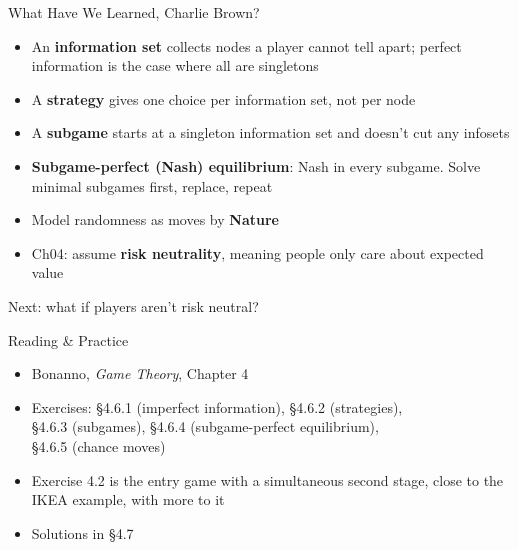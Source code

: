 \begin{frame}{What Have We Learned, Charlie Brown?}
\begin{itemize}
    \item An \textbf{information set} collects nodes a player cannot tell apart;
      perfect information is the case where all are singletons
    \item A \textbf{strategy} gives one choice per information set, not per node
    \item A \textbf{subgame} starts at a singleton information set and doesn't cut any infosets
    \item \textbf{Subgame-perfect (Nash) equilibrium}: Nash in every subgame. Solve minimal
      subgames first, replace, repeat
    \item Model randomness as moves by \textbf{Nature}
    \item Ch04: assume \textbf{risk neutrality}, meaning people only care about expected value
\end{itemize}
\vfill
Next: what if players aren't risk neutral?
\vspace{-0.4in}
\end{frame}

\begin{frame}{Reading \& Practice}
\begin{itemize}
    \item Bonanno, \textit{Game Theory}, Chapter 4
    \item Exercises: \S4.6.1 (imperfect information), \S4.6.2 (strategies),\\
      \S4.6.3 (subgames), \S4.6.4 (subgame-perfect equilibrium),\\
      \S4.6.5 (chance moves)
    \item Exercise 4.2 is the entry game with a simultaneous second stage, close to
      the IKEA example, with more to it
    \item Solutions in \S4.7
\end{itemize}
\vfill
\end{frame}


